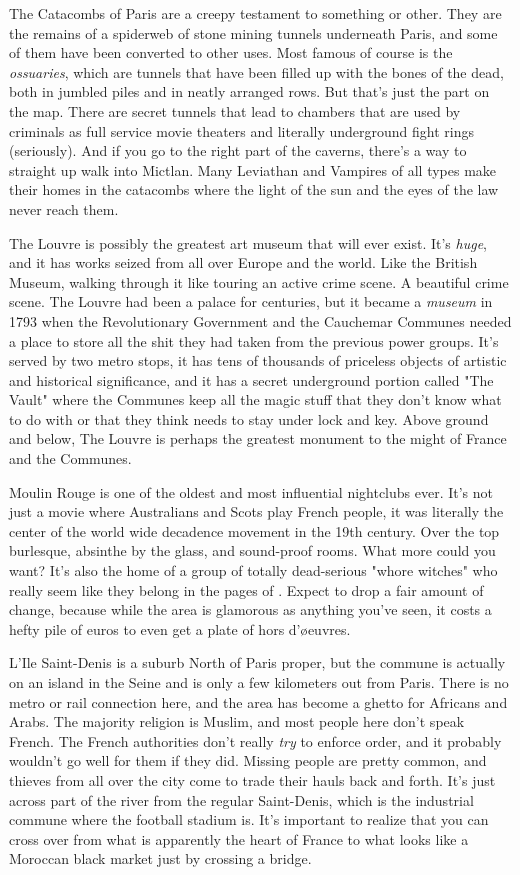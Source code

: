 The Catacombs of Paris are a creepy testament to something or other. They are the remains of a spiderweb of stone mining tunnels underneath Paris, and some of them have been converted to other uses. Most famous of course is the \textit{ossuaries}, which are tunnels that have been filled up with the bones of the dead, both in jumbled piles and in neatly arranged rows. But that's just the part on the map. There are secret tunnels that lead to chambers that are used by criminals as full service movie theaters and literally underground fight rings (seriously). And if you go to the right part of the caverns, there's a way to straight up walk into Mictlan. Many Leviathan and Vampires of all types make their homes in the catacombs where the light of the sun and the eyes of the law never reach them.

The Louvre is possibly the greatest art museum that will ever exist. It's \textit{huge}, and it has works seized from all over Europe and the world. Like the British Museum, walking through it like touring an active crime scene. A beautiful crime scene. The Louvre had been a palace for centuries, but it became a \textit{museum} in 1793 when the Revolutionary Government and the Cauchemar Communes needed a place to store all the shit they had taken from the previous power groups. It's served by two metro stops, it has tens of thousands of priceless objects of artistic and historical significance, and it has a secret underground portion called "The Vault" where the Communes keep all the magic stuff that they don't know what to do with or that they think needs to stay under lock and key. Above ground and below, The Louvre is perhaps the greatest monument to the might of France and the Communes.

Moulin Rouge is one of the oldest and most influential nightclubs ever. It's not just a movie where Australians and Scots play French people, it was literally the center of the world wide decadence movement in the 19th century. Over the top burlesque, absinthe by the glass, and sound-proof rooms. What more could you want? It's also the home of a group of totally dead-serious "whore witches" who really seem like they belong in the pages of . Expect to drop a fair amount of change, because while the area is glamorous as anything you've seen, it costs a hefty pile of euros to even get a plate of hors d'\o{e}uvres. 

L'Ile Saint-Denis is a suburb North of Paris proper, but the commune is actually on an island in the Seine and is only a few kilometers out from Paris. There is no metro or rail connection here, and the area has become a ghetto for Africans and Arabs. The majority religion is Muslim, and most people here don't speak French. The French authorities don't really \textit{try} to enforce order, and it probably wouldn't go well for them if they did. Missing people are pretty common, and thieves from all over the city come to trade their hauls back and forth. It's just across part of the river from the regular Saint-Denis, which is the industrial commune where the football stadium is. It's important to realize that you can cross over from what is apparently the heart of France to what looks like a Moroccan black market just by crossing a bridge.

